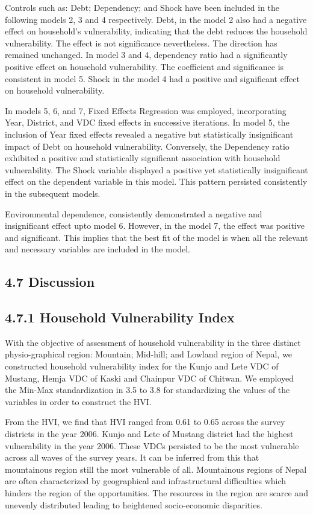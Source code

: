 \documentclass[12pt, a4paper]{article}
\begin{document}
Controls such as: Debt; Dependency; and Shock have been included in the following models 2, 3 and 4 respectively. Debt, in the model 2 also had a negative effect on household's vulnerability, indicating that the debt reduces the household vulnerability. The effect is not significance nevertheless. The direction has remained unchanged. In model 3 and 4, dependency ratio had a significantly positive effect on household vulnerability. The coefficient and significance is consistent in model 5. Shock in the model 4 had a positive and significant effect on household vulnerability. 

In models 5, 6, and 7, Fixed Effects Regression was employed, incorporating Year, District, and VDC fixed effects in successive iterations. In model 5, the inclusion of Year fixed effects revealed a negative but statistically insignificant impact of Debt on household vulnerability. Conversely, the Dependency ratio exhibited a positive and statistically significant association with household vulnerability. The Shock variable displayed a positive yet statistically insignificant effect on the dependent variable in this model. This pattern persisted consistently in the subsequent models.

Environmental dependence, consistently demonstrated a negative and insignificant effect upto model 6. However, in the model 7, the effect was positive and significant. This implies that the best fit of the model is when all the relevant and necessary variables are included in the model. 

\subsection*{4.7 Discussion}
\renewcommand{\thepage}{\arabic{page}}
\subsection*{4.7.1 Household Vulnerability Index}
With the objective of assessment of household vulnerability in the three distinct physio-graphical region: Mountain; Mid-hill; and Lowland region of Nepal, we constructed household vulnerability index for the Kunjo and Lete VDC of Mustang, Hemja VDC of Kaski and Chainpur VDC of Chitwan. We employed the Min-Max standardization in 3.5 to 3.8 for standardizing the values of the variables in order to construct the HVI. 

From the HVI, we find that HVI ranged from 0.61 to 0.65 across the survey districts in the year 2006. Kunjo and Lete of Mustang district had the highest vulnerability in the year 2006. These VDCs persisted to be the most vulnerable across all waves of the survey years. It can be inferred from this that mountainous region still the most vulnerable of all. Mountainous regions of Nepal are often characterized by geographical and infrastructural difficulties which hinders the region of the opportunities. The resources in the region are scarce and unevenly distributed leading to heightened socio-economic disparities.    
\end{document}
